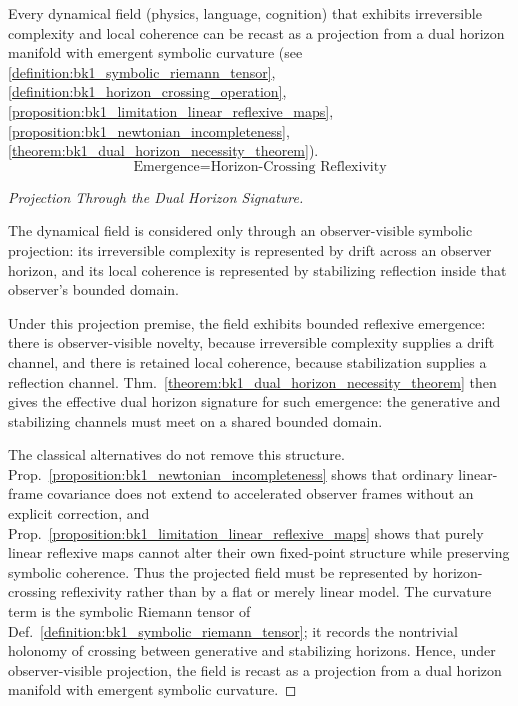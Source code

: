 \begin{theorem}
\label{theorem:bk1_dual_horizon_unification_principle}
Every dynamical field (physics, language, cognition) that exhibits irreversible complexity and local coherence can be recast as a projection from a dual horizon manifold with emergent symbolic curvature (see \ref{definition:bk1_symbolic_riemann_tensor}, \ref{definition:bk1_horizon_crossing_operation}, \ref{proposition:bk1_limitation_linear_reflexive_maps}, \ref{proposition:bk1_newtonian_incompleteness}, \ref{theorem:bk1_dual_horizon_necessity_theorem}).
\[
\text{Emergence} = \text{Horizon-Crossing Reflexivity}
\]
\end{theorem}
\begin{proof}[Projection Through the Dual Horizon Signature]
\label{proof:bk1_dual_horizon_unification_principle}
\leavevmode

\begin{assumption}
The dynamical field is considered only through an observer-visible symbolic
projection: its irreversible complexity is represented by drift across an
observer horizon, and its local coherence is represented by stabilizing
reflection inside that observer's bounded domain.
\end{assumption}

Under this projection premise, the field exhibits bounded reflexive emergence:
there is observer-visible novelty, because irreversible complexity supplies a
drift channel, and there is retained local coherence, because stabilization
supplies a reflection channel. Thm.~\ref{theorem:bk1_dual_horizon_necessity_theorem}
then gives the effective dual horizon signature for such emergence: the
generative and stabilizing channels must meet on a shared bounded domain.

The classical alternatives do not remove this structure. Prop.~\ref{proposition:bk1_newtonian_incompleteness}
shows that ordinary linear-frame covariance does not extend to accelerated
observer frames without an explicit correction, and
Prop.~\ref{proposition:bk1_limitation_linear_reflexive_maps} shows that purely
linear reflexive maps cannot alter their own fixed-point structure while
preserving symbolic coherence. Thus the projected field must be represented by
horizon-crossing reflexivity rather than by a flat or merely linear model. The
curvature term is the symbolic Riemann tensor of
Def.~\ref{definition:bk1_symbolic_riemann_tensor}; it records the nontrivial
holonomy of crossing between generative and stabilizing horizons. Hence, under
observer-visible projection, the field is recast as a projection from a dual
horizon manifold with emergent symbolic curvature.
\end{proof}

